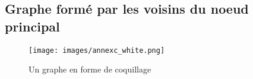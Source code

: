 \documentclass[12pt,twoside, openright]{memoir}
\begin{document}
\begin{appendices}
		\chapter{Graphe formé par les voisins du noeud principal}
		\label{annex:C}
		\begin{figure}[!ht]
			\centering
			\texttt{[image: images/annexc\_white.png]}
			\caption{Un graphe en forme de coquillage}
		\end{figure}
	\end{appendices}
	
	
	
\end{document}
